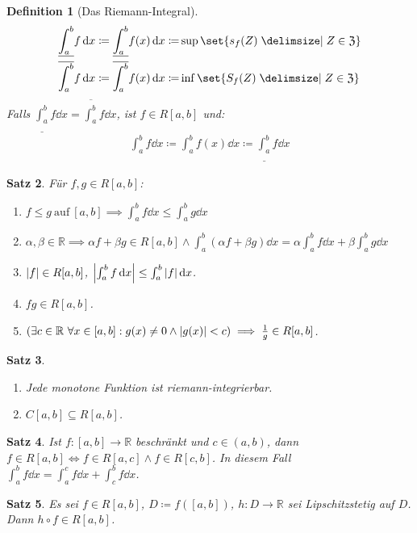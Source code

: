 \documentclass[a4paper]{article}
\newcounter{Sec}
\theoremstyle{marginbreak}
\newtheorem{definition}{Definition}[Sec]
\newtheorem{satz}[definition]{Satz}
\renewcommand{\d}{\dd}
\begin{document}
	\begin{definition}[Das Riemann-Integral]
		\begin{align*}
			\underline{\int_{a}^{b}}f\d{x}\coloneqq\underline{\int_{a}^{b}}f(x)\d{x}\coloneqq&\sup\set{s_f(Z)\given Z\in\mathfrak{Z}}\\
			\overline{\int_{a}^{b}}f\d{x}\coloneqq\overline{\int_{a}^{b}}f(x)\d{x}\coloneqq&\inf\set{S_f(Z)\given Z\in\mathfrak{Z}}
		\end{align*}
		Falls $\underline{\int_{a}^{b}}f\d{x}=\overline{\int_{a}^{b}}f\d{x}$, ist $f\in R[a,b]$ und:
		\begin{align*}
			\int_{a}^{b}f\d{x}\coloneqq\int_{a}^{b}f(x)\d{x}\coloneqq\underline{\int_{a}^{b}}f\d{x}
		\end{align*}
	\end{definition}
	\begin{satz}
		Für $f,g\in R[a,b]$:
		\begin{enumerate}[label=(\alph*)]
			\item $f\leq g~\text{auf}~[a,b]\implies\int_a^bf\d{x}\leq\int_a^bg\d{x}$
			\item $\alpha,\beta\in\mathbb{R}\implies\alpha f+\beta g\in R[a,b]\wedge
				\int_a^b(\alpha f+\beta g)\d{x}=\alpha\int_a^bf\d{x}+\beta\int_a^bg\d{x}$
			\item $\abs{f}\in R[a,b]$, $\abs{\int_a^bf\d{x}}\leq\int_a^b\abs{f}\d{x}$.
			\item $fg\in R[a,b]$.
			\item $(\exists c\in\mathbb{R}~\forall x\in[a,b]:g(x)\neq0\wedge\abs{g(x)}<c)\implies\frac{1}{g}\in R[a,b]$.
		\end{enumerate}
	\end{satz}
	\begin{satz}
		\begin{enumerate}[label=(\alph*)]
			\item Jede monotone Funktion ist riemann-integrierbar.
			\item $C[a,b]\subseteq R[a,b]$.
		\end{enumerate}
	\end{satz}
	\begin{satz}
		 Ist $f\colon [a,b]\to\mathbb{R}$ beschränkt und $c\in(a,b)$, dann
		 $f\in R[a,b]\iff f\in R[a,c]\wedge f\in R[c,b]$. In diesem Fall
		 $\int_a^bf\d{x}=\int_a^cf\d{x}+\int_c^bf\d{x}$.
	\end{satz}
	\begin{satz}
		Es sei $f\in R[a,b]$, $D\coloneqq f([a,b])$, $h\colon D\to\mathbb{R}$ sei
		Lipschitzstetig auf $D$. Dann $h\circ f\in R[a,b]$.
	\end{satz}
\end{document}
